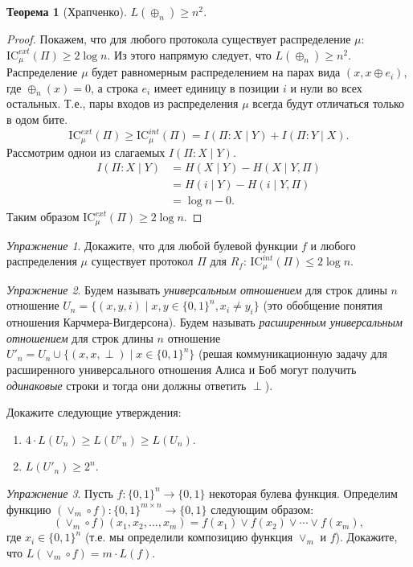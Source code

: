 \documentclass[12pt]{article}
\newcommand{\bits}{\{0,1\}}
\newcommand{\seqn}[2]{{#1}_1,{#1}_2,\dotsc,{#1}_{#2}}
\newcommand{\IC}{\mathrm{IC}}
\theoremstyle{definition}
\theoremstyle{plain}
\newtheorem{theorem}{Теорема}[section]
\theoremstyle{remark}
\newtheorem{exercise}{Упражнение}[section]
\begin{document}
\begin{theorem}[Храпченко]
    $L(\oplus_n)\ge n^2$.
\end{theorem}
\begin{proof}
    Покажем, что для любого протокола существует распределение $\mu$: $\IC^{ext}_\mu(\Pi)\ge 2\log n$.
    Из этого напрямую следует, что $L(\oplus_n)\ge n^2$.
    Распределение $\mu$ будет равномерным распределением на парах вида $(x,x\oplus e_i)$,
    где $\oplus_n(x) = 0$, а строка $e_i$ имеет единицу в позиции $i$ и нули во всех остальных. 
    Т.е., пары входов из распределения $\mu$ всегда будут отличаться только в одом бите.
    \[
        \IC_\mu^{ext}(\Pi) 
        \ge \IC_\mu^{int}(\Pi)  
         = I(\Pi:X\mid Y) + I(\Pi:Y\mid X).
    \]
    Рассмотрим однои из слагаемых $I(\Pi:X\mid Y)$.
    \[\begin{aligned}
        I(\Pi:X\mid Y) &= H(X\mid Y) - H(X\mid Y,\Pi)\\
                       &= H(i\mid Y) - H(i\mid Y,\Pi)\\
                       &= \log n - 0.
    \end{aligned}\]
    Таким образом $\IC_\mu^{ext}(\Pi) \ge 2\log n$.
\end{proof}
\begin{exercise}
    Докажите, что для любой булевой функции $f$ и любого распределения $\mu$
    существует протокол $\Pi$ для $R_f$: $\IC^{int}_\mu(\Pi) \le 2\log n$.
\end{exercise}
\begin{exercise}
    Будем называть \emph{универсальным отношением} для строк длины $n$ отношение 
    $U_n = \{(x,y,i) \mid x,y\in\bits^n, x_i\neq y_i\}$ (это обобщение понятия
    отношения Карчмера-Вигдерсона). Будем называть \emph{расширенным универсальным
    отношением} для строк длины $n$ отношение $U'_n = U_n\cup \{(x,x,\perp)\mid x\in\bits^n\}$
    (решая коммуникационную задачу для расширенного универсального отношения
    Алиса и Боб могут получить \emph{одинаковые} строки и тогда они должны ответить $\perp$).

    Докажите следующие утверждения:
    \begin{enumerate}
        \item $4\cdot L(U_n) \ge L(U'_n) \ge L(U_n)$.
        \item $L(U'_n) \ge 2^n$.
    \end{enumerate}
\end{exercise}
\begin{exercise}
    Пусть $f:\bits^n\to\bits$ некоторая булева функция. Определим функцию $(\lor_m\circ f): \bits^{m\times n}\to\bits$
    следующим образом: $$(\lor_m\circ f)(\seqn{x}{m}) = f(x_1)\lor f(x_2)\lor \dotsb\lor f(x_m),$$
    где $x_i\in\bits^n$ (т.е. мы определили композицию функция $\lor_m$ и $f$). Докажите, что $L(\lor_m\circ f) =
    m\cdot L(f)$. 
\end{exercise}
\end{document}
